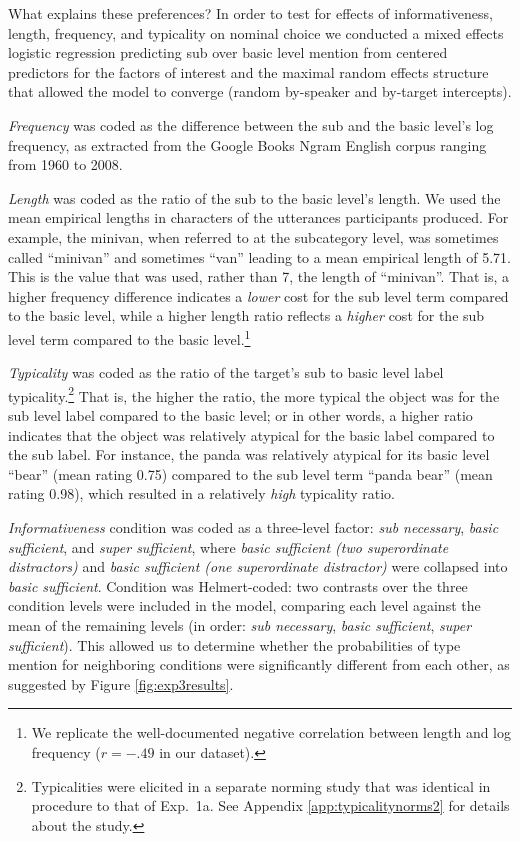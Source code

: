 \documentclass[11pt]{article}
\newcommand{\figref}[1]{Figure \ref{#1}}
\newcommand{\appref}[1]{Appendix \ref{#1}}
\begin{document}
What explains these preferences? In order to test for effects of informativeness, length, frequency, and typicality on nominal choice we conducted a mixed effects logistic regression predicting sub over basic level mention from centered predictors for the factors of interest and the maximal random effects structure that allowed the model to converge (random by-speaker and by-target intercepts).

\emph{Frequency} was coded as the difference between the sub and the basic level's log frequency, as extracted from the Google Books Ngram English corpus ranging from 1960 to 2008. 

\emph{Length} was coded as the ratio of the sub to the basic level's length. We used the mean empirical lengths in characters of the utterances participants produced. For example, the minivan, when referred to at the subcategory level, was sometimes called ``minivan'' and sometimes ``van'' leading to a mean empirical length of 5.71. This is the value that was used, rather than 7, the length of ``minivan''. That is, a higher frequency difference indicates a \emph{lower} cost for the sub level term compared to the basic level, while a higher length ratio reflects a \emph{higher} cost for the sub level term compared to the basic level.\footnote{We replicate the well-documented negative correlation between length and log frequency ($r = -.49$ in our dataset).} 

\emph{Typicality} was coded as the ratio of the target's sub to basic level label typicality.\footnote{Typicalities were elicited in a separate norming study that was identical in procedure to that of Exp.~1a. See \appref{app:typicalitynorms2} for details about the study.} That is, the higher the ratio, the more typical the object was for the sub level label compared to the basic level; or in other words, a higher ratio indicates that the object was relatively atypical for the basic label compared to the sub label. For instance, the panda was relatively atypical for its basic level ``bear'' (mean rating 0.75) compared to the sub level term ``panda bear'' (mean rating 0.98), which resulted in a relatively \emph{high} typicality ratio.

\emph{Informativeness} condition was coded as a three-level factor: \emph{sub necessary}, \emph{basic sufficient}, and \emph{super sufficient}, where \emph{basic sufficient (two superordinate distractors)} and \emph{basic sufficient (one superordinate distractor)} were collapsed into \emph{basic sufficient}. Condition was Helmert-coded: two contrasts over the three condition levels were included in the model, comparing each level against the mean of the remaining levels (in order: \emph{sub necessary}, \emph{basic sufficient}, \emph{super sufficient}). This allowed us to determine whether the probabilities of type mention  for neighboring conditions were significantly different from each other, as suggested by \figref{fig:exp3results}.
\end{document}
